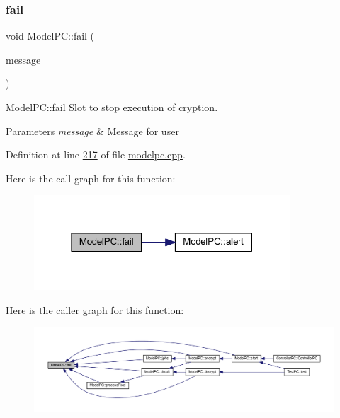 \subsubsection{\texorpdfstring{fail}{fail}}
{\footnotesize\ttfamily void Model\+P\+C\+::fail (\begin{DoxyParamCaption}\item[{Q\+String}]{message }\end{DoxyParamCaption})\hspace{0.3cm}{\ttfamily [slot]}}



\mbox{\hyperlink{class_model_p_c_a47464b59b7e37fcee25e55475708aabd}{Model\+P\+C\+::fail}} Slot to stop execution of cryption. 


\begin{DoxyParams}{Parameters}
{\em message} & Message for user \\
\hline
\end{DoxyParams}


Definition at line \mbox{\hyperlink{modelpc_8cpp_source_l00217}{217}} of file \mbox{\hyperlink{modelpc_8cpp_source}{modelpc.\+cpp}}.

Here is the call graph for this function\+:
\nopagebreak
\begin{figure}[H]
\begin{center}
\leavevmode
\includegraphics[width=271pt]{class_model_p_c_a47464b59b7e37fcee25e55475708aabd_cgraph}
\end{center}
\end{figure}
Here is the caller graph for this function\+:
\nopagebreak
\begin{figure}[H]
\begin{center}
\leavevmode
\includegraphics[width=350pt]{class_model_p_c_a47464b59b7e37fcee25e55475708aabd_icgraph}
\end{center}
\end{figure}
\mbox{\label{class_model_p_c_a8bee0255c09449868c7e6097afaaf0cd}} 
